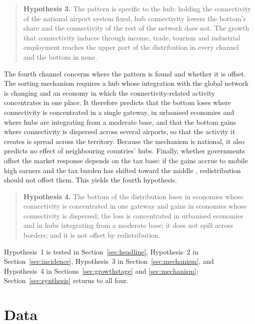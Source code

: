 \begin{quote}
\textbf{Hypothesis 3.} The pattern is specific to the hub: holding the connectivity of the national airport system fixed, hub connectivity lowers the bottom's share and the connectivity of the rest of the network does not. The growth that connectivity induces through income, trade, tourism and industrial employment reaches the upper part of the distribution in every channel and the bottom in none.
\end{quote}

The fourth channel concerns where the pattern is found and whether it is offset. The sorting mechanism requires a hub whose integration with the global network is changing and an economy in which the connectivity-related activity concentrates in one place. It therefore predicts that the bottom loses where connectivity is concentrated in a single gateway, in urbanised economies and where hubs are integrating from a moderate base, and that the bottom gains where connectivity is dispersed across several airports, so that the activity it creates is spread across the territory. Because the mechanism is national, it also predicts no effect of neighbouring countries' hubs. Finally, whether governments offset the market response depends on the tax base: if the gains accrue to mobile high earners and the tax burden has shifted toward the middle \citep{Egger_2019,Kleven_2013}, redistribution should not offset them. This yields the fourth hypothesis.

\begin{quote}
\textbf{Hypothesis 4.} The bottom of the distribution loses in economies whose connectivity is concentrated in one gateway and gains in economies whose connectivity is dispersed; the loss is concentrated in urbanised economies and in hubs integrating from a moderate base; it does not spill across borders; and it is not offset by redistribution.
\end{quote}

Hypothesis~1 is tested in Section~\ref{sec:headline}, Hypothesis~2 in Section~\ref{sec:incidence}, Hypothesis~3 in Section~\ref{sec:mechanism}, and Hypothesis~4 in Sections~\ref{sec:growthstage} and \ref{sec:mechanism}; Section~\ref{sec:synthesis} returns to all four.

\section{Data}
\label{sec:data}
